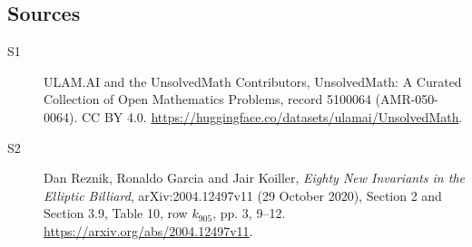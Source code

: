 \documentclass[11pt]{article}
\begin{document}
\subsection{Sources}
\begin{description}
\item[\hypertarget{source:5100064:1}{S1}] ULAM.AI and the UnsolvedMath Contributors, UnsolvedMath: A Curated Collection of Open Mathematics Problems, record 5100064 (AMR-050-0064). CC BY 4.0. \url{https://huggingface.co/datasets/ulamai/UnsolvedMath}.
\item[\hypertarget{source:5100064:2}{S2}] Dan Reznik, Ronaldo Garcia and Jair Koiller, \emph{Eighty New Invariants in the Elliptic Billiard}, arXiv:2004.12497v11 (29 October 2020), Section 2 and Section 3.9, Table 10, row $k_{905}$, pp. 3, 9--12. \url{https://arxiv.org/abs/2004.12497v11}.
\end{description}
\label{end:5100064}
\end{document}

